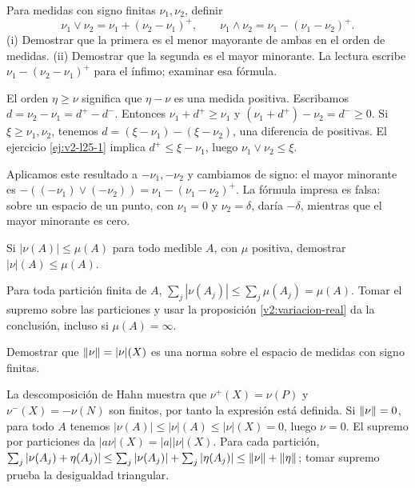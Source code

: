 \begin{ejercicio}\label{ej:v2-l25-2}
Para medidas con signo finitas $\nu_1,\nu_2$, definir
\[
 \nu_1\vee\nu_2=\nu_1+(\nu_2-\nu_1)^+,
 \qquad \nu_1\wedge\nu_2=\nu_1-(\nu_1-\nu_2)^+.
\]
(i) Demostrar que la primera es el menor mayorante de ambas en el orden de medidas. (ii) Demostrar que la segunda es el mayor minorante. La lectura escribe $\nu_1-(\nu_2-\nu_1)^+$ para el ínfimo; examinar esa fórmula.
\end{ejercicio}
\begin{solucion}
El orden $\eta\ge\nu$ significa que $\eta-\nu$ es una medida positiva. Escribamos $d=\nu_2-\nu_1=d^+-d^-$. Entonces $\nu_1+d^+\ge\nu_1$ y $(\nu_1+d^+)-\nu_2=d^-\ge0$. Si $\xi\ge\nu_1,\nu_2$, tenemos $d=(\xi-\nu_1)-(\xi-\nu_2)$, una diferencia de positivas. El ejercicio \ref{ej:v2-l25-1} implica $d^+\le\xi-\nu_1$, luego $\nu_1\vee\nu_2\le\xi$.

Aplicamos este resultado a $-\nu_1,-\nu_2$ y cambiamos de signo: el mayor minorante es $-((-\nu_1)\vee(-\nu_2))=\nu_1-(\nu_1-\nu_2)^+$. La fórmula impresa es falsa: sobre un espacio de un punto, con $\nu_1=0$ y $\nu_2=\delta$, daría $-\delta$, mientras que el mayor minorante es cero.
\end{solucion}

\begin{ejercicio}\label{ej:v2-l25-3}
Si $|\nu(A)|\le\mu(A)$ para todo medible $A$, con $\mu$ positiva, demostrar $|\nu|(A)\le\mu(A)$.
\end{ejercicio}
\begin{solucion}
Para toda partición finita de $A$, $\sum_j|\nu(A_j)|\le\sum_j\mu(A_j)=\mu(A)$. Tomar el supremo sobre las particiones y usar la proposición \ref{v2:variacion-real} da la conclusión, incluso si $\mu(A)=\infty$.
\end{solucion}

\begin{ejercicio}\label{ej:v2-l25-4}
Demostrar que $\left\lVert\nu\right\rVert=|\nu|(X)$ es una norma sobre el espacio de medidas con signo finitas.
\end{ejercicio}
\begin{solucion}
La descomposición de Hahn muestra que $\nu^+(X)=\nu(P)$ y $\nu^-(X)=-\nu(N)$ son finitos, por tanto la expresión está definida. Si $\left\lVert\nu\right\rVert=0$, para todo $A$ tenemos $|\nu(A)|\le|\nu|(A)\le|\nu|(X)=0$, luego $\nu=0$. El supremo por particiones da $|a\nu|(X)=|a||\nu|(X)$. Para cada partición, $\sum_j|\nu(A_j)+\eta(A_j)|\le\sum_j|\nu(A_j)|+\sum_j|\eta(A_j)|\le\left\lVert\nu\right\rVert+\left\lVert\eta\right\rVert$; tomar supremo prueba la desigualdad triangular.
\end{solucion}

